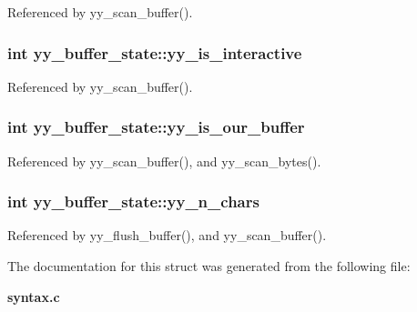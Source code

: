 Referenced by yy\_\-scan\_\-buffer().
\subsubsection[{yy\_\-is\_\-interactive}]{\setlength{\rightskip}{0pt plus 5cm}int {\bf yy\_\-buffer\_\-state::yy\_\-is\_\-interactive}}\label{structyy__buffer__state_bf5c70eea75581b58c0ee7bd31b14490}




Referenced by yy\_\-scan\_\-buffer().
\subsubsection[{yy\_\-is\_\-our\_\-buffer}]{\setlength{\rightskip}{0pt plus 5cm}int {\bf yy\_\-buffer\_\-state::yy\_\-is\_\-our\_\-buffer}}\label{structyy__buffer__state_80ce2431c70dc4f89ced487f18449465}




Referenced by yy\_\-scan\_\-buffer(), and yy\_\-scan\_\-bytes().
\subsubsection[{yy\_\-n\_\-chars}]{\setlength{\rightskip}{0pt plus 5cm}int {\bf yy\_\-buffer\_\-state::yy\_\-n\_\-chars}}\label{structyy__buffer__state_06406208824817acfec2183b79080945}




Referenced by yy\_\-flush\_\-buffer(), and yy\_\-scan\_\-buffer().

The documentation for this struct was generated from the following file:\begin{CompactItemize}
\item 
{\bf syntax.c}\end{CompactItemize}
